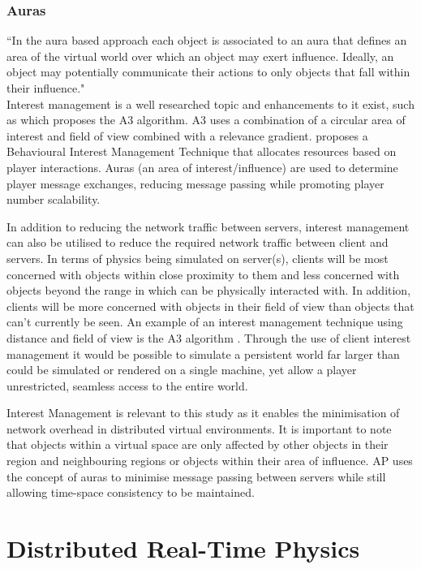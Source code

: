 \subsubsection{Auras}
``In the aura based approach each object is associated to an aura that defines an area of the virtual world over which an object may exert influence. Ideally, an object may potentially communicate their actions to only objects that fall within their influence."\cite{storey2004determining}\\

Interest management is a well researched topic and enhancements to it exist, such as \cite{Bezerra2008} which proposes the A3 algorithm. A3 uses a combination of a circular area of interest and field of view combined with a relevance gradient. \cite{LoadBalancingforMMOs} proposes a Behavioural Interest Management Technique that allocates resources based on player interactions. Auras (an area of interest/influence) are used to determine player message exchanges, reducing message passing while promoting player number scalability.

In addition to reducing the network traffic between servers, interest management can also be utilised to reduce the required network traffic between client and servers. In terms of physics being simulated on server(s), clients will be most concerned with objects within close proximity to them and less concerned with objects beyond the range in which can be physically interacted with. In addition, clients will be more concerned with objects in their field of view than objects that can't currently be seen. An example of an interest management technique using distance and field of view is the A3 algorithm \cite{Bezerra2008}. Through the use of client interest management it would be possible to simulate a persistent world far larger than could be simulated or rendered on a single machine, yet allow a player unrestricted, seamless access to the entire world.

Interest Management is relevant to this study as it enables the minimisation of network overhead in distributed virtual environments. It is important to note that objects within a virtual space are only affected by other objects in their region and neighbouring regions or objects within their area of influence. AP uses the concept of auras to minimise message passing between servers while still allowing time-space consistency to be maintained.

\section{Distributed Real-Time Physics}

